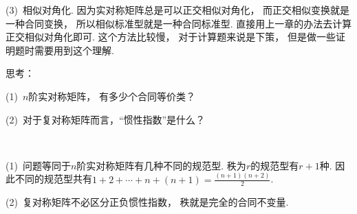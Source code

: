(3)~相似对角化.
因为实对称矩阵总是可以正交相似对角化，
而正交相似变换就是一种合同变换，
所以相似标准型就是一种合同标准型.
直接用上一章的办法去计算正交相似对角化即可.
这个方法比较慢，
对于计算题来说是下策，
但是做一些证明题时需要用到这个理解.

\bigskip

\begin{example}
    思考：
    
    (1)~$n$阶实对称矩阵，
    有多少个合同等价类？
    
    (2)~对于复对称矩阵而言，“惯性指数”是什么？
\end{example}
\smallskip
\begin{solution}
    ~

    (1)~问题等同于$n$阶实对称矩阵有几种不同的规范型.
    秩为$r$的规范型有$r+1$种.
    因此不同的规范型共有$1+2+\cdots + n + (n+1) = \frac{(n+1)(n+2)}{2}$.

    \medskip

    (2)~复对称矩阵不必区分正负惯性指数，
    秩就是完全的合同不变量.
\end{solution}

\bigskip


